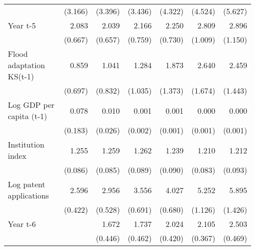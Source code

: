 \begin{table}[htbp]
\begin{tabular}{l*{6}{D{.}{.}{-1}}}
                    &     (3.166)         &     (3.396)         &     (3.436)         &     (4.322)         &     (4.524)         &     (5.627)         \\
\addlinespace
Year t-5            &       2.083\sym{**} &       2.039\sym{**} &       2.166\sym{**} &       2.250\sym{**} &       2.809\sym{***}&       2.896\sym{***}\\
                    &     (0.667)         &     (0.657)         &     (0.759)         &     (0.730)         &     (1.009)         &     (1.150)         \\
\addlinespace
Flood adaptation KS(t-1)&       0.859         &       1.041         &       1.284         &       1.873         &       2.640\sym{\%}  &       2.459\sym{\%}  \\
                    &     (0.697)         &     (0.832)         &     (1.035)         &     (1.373)         &     (1.674)         &     (1.443)         \\
\addlinespace
Log GDP per capita (t-1)&       0.078         &       0.010\sym{*}  &       0.001\sym{**} &       0.001\sym{***}&       0.000\sym{***}&       0.000\sym{***}\\
                    &     (0.183)         &     (0.026)         &     (0.002)         &     (0.001)         &     (0.001)         &     (0.001)         \\
\addlinespace
Institution index   &       1.255\sym{***}&       1.259\sym{***}&       1.262\sym{***}&       1.239\sym{***}&       1.210\sym{***}&       1.212\sym{**} \\
                    &     (0.086)         &     (0.085)         &     (0.089)         &     (0.090)         &     (0.083)         &     (0.093)         \\
\addlinespace
Log patent applications&       2.596\sym{***}&       2.956\sym{***}&       3.556\sym{***}&       4.027\sym{***}&       5.252\sym{***}&       5.895\sym{***}\\
                    &     (0.422)         &     (0.528)         &     (0.691)         &     (0.680)         &     (1.126)         &     (1.426)         \\
\addlinespace
Year t-6            &                     &       1.672\sym{*}  &       1.737\sym{**} &       2.024\sym{***}&       2.105\sym{***}&       2.503\sym{***}\\
                    &                     &     (0.446)         &     (0.462)         &     (0.420)         &     (0.367)         &     (0.469)         \\

\end{tabular}
\end{table}
